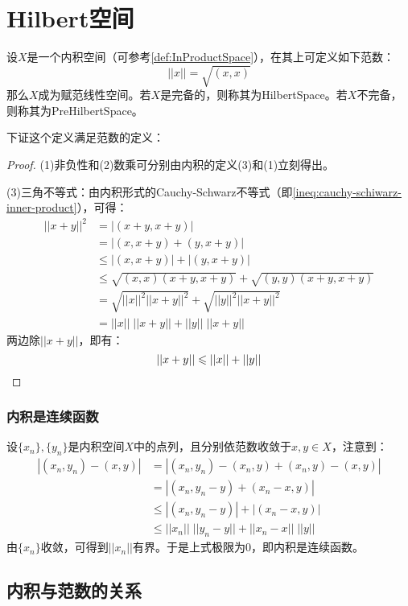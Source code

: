 \section{Hilbert空间}
\begin{definition}
	设$X$是一个内积空间（可参考\cref{def:InProductSpace}），在其上可定义如下范数：
	\begin{equation*}
		||x||=\sqrt{(x,x)}
	\end{equation*}
	那么$X$成为赋范线性空间。若$X$是完备的，则称其为\gls{HilbertSpace}。若$X$不完备，则称其为\gls{PreHilbertSpace}。
\end{definition}
下证这个定义满足范数的定义：
\begin{proof}
	(1)非负性和(2)数乘可分别由内积的定义(3)和(1)立刻得出。\par
	(3)三角不等式：由内积形式的Cauchy-Schwarz不等式（即\cref{ineq:cauchy-schiwarz-inner-product}），可得：
	\begin{align*}
		||x+y||^2&=|(x+y,x+y)| \\
		&=|(x,x+y)+(y,x+y)| \\
		&\leqslant|(x,x+y)|+|(y,x+y)| \\
		&\leqslant\sqrt{(x,x)(x+y,x+y)}+\sqrt{(y,y)(x+y,x+y)} \\
		&=\sqrt{||x||^2||x+y||^2}+\sqrt{||y||^2||x+y||^2} \\
		&=||x||\;||x+y||+||y||\;||x+y||
	\end{align*}
	两边除$||x+y||$，即有：
	\begin{equation*}
		||x+y||\leqslant||x||+||y|| \qedhere
	\end{equation*}
\end{proof}
\subsubsection{内积是连续函数}
设$\{x_n\},\{y_n\}$是内积空间$X$中的点列，且分别依范数收敛于$x,y\in X$，注意到：
\begin{align*}
	|(x_n,y_n)-(x,y)|&=|(x_n,y_n)-(x_n,y)+(x_n,y)-(x,y)| \\
	&=|(x_n,y_n-y)+(x_n-x,y)| \\
	&\leqslant|(x_n,y_n-y)|+|(x_n-x,y)| \\
	&\leqslant||x_n||\;||y_n-y||+||x_n-x||\;||y|| 
\end{align*}
由$\{x_n\}$收敛，可得到$||x_n||$有界。于是上式极限为$0$，即内积是连续函数。

\subsection{内积与范数的关系}
